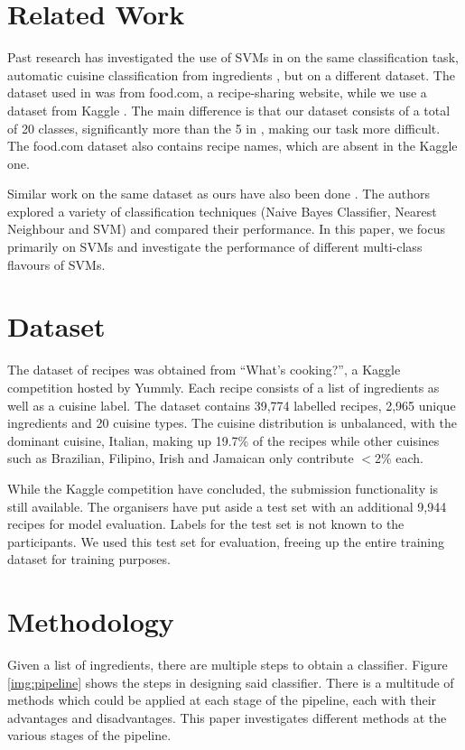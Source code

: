 \documentclass{article}
\begin{document}
\section{Related Work}
Past research has investigated the use of SVMs in on the same classification task, automatic cuisine classification from ingredients \cite{autorecipe}, but on a different dataset. The dataset used in \cite{autorecipe} was from food.com, a recipe-sharing website, while we use a dataset from Kaggle \cite{kaggle}. The main difference is that our dataset consists of a total of 20 classes, significantly more than the 5 in \cite{autorecipe}, making our task more difficult. The food.com dataset also contains recipe names, which are absent in the Kaggle one. 

Similar work on the same dataset as ours have also been done \cite{KaggleRecipe}. The authors explored a variety of classification techniques (Naive Bayes Classifier, Nearest Neighbour and SVM) and compared their performance. In this paper, we focus primarily on SVMs and investigate the performance of different multi-class flavours of SVMs.

\section{Dataset}
The dataset of recipes was obtained from “What’s cooking?”, a Kaggle competition \cite{kaggle} hosted by Yummly. Each recipe consists of a list of ingredients as well as a cuisine label. The dataset contains 39,774 labelled recipes, 2,965 unique ingredients and 20 cuisine types. The cuisine distribution is unbalanced, with the dominant cuisine, Italian, making up 19.7\% of the recipes while other cuisines such as Brazilian, Filipino, Irish and Jamaican only contribute $<$2\% each.

While the Kaggle competition have concluded, the submission functionality is still available. The organisers have put aside a test set with an additional 9,944 recipes for model evaluation. Labels for the test set is not known to the participants. We used this test set for evaluation, freeing up the entire training dataset for training purposes.

\section{Methodology}\label{methods}
Given a list of ingredients, there are multiple steps to obtain a classifier. Figure \ref{img:pipeline} shows the steps in designing said classifier. There is a multitude of methods which could be applied at each stage of the pipeline, each with their advantages and disadvantages. This paper investigates different methods at the various stages of the pipeline.  
\end{document}
